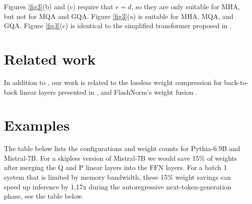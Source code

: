 \documentclass{article}
\begin{document}
Figures \ref{fig3}(b) and (c) require that $e = d$, so they are only suitable for MHA, but not for MQA and GQA. Figure \ref{fig3}(a) is suitable for MHA, MQA, and GQA. Figure \ref{fig3}(c) is identical to the simplified transformer proposed in \cite{simplified}.

\section{Related work}
In addition to \cite{simplified}, our work is related to the lossless weight compression for back-to-back linear layers presented in \cite{matShrink}, and FlashNorm's weight fusion \cite{flashNorm}.

\section{Examples}
The table below lists the configurations and weight counts for Pythia-6.9B and Mistral-7B. For a skipless version of Mistral-7B we would save 15\% of weights after merging the Q and P linear layers into the FFN layers. For a batch 1 system that is limited by memory bandwidth, these 15\% weight savings can speed up inference by 1.17x during the autoregressive next-token-generation phase, see the table below.
\end{document}
